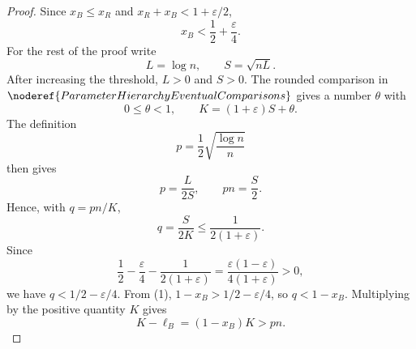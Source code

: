 \begin{proof}
Since \(x_B\le x_R\) and \(x_R+x_B<1+\varepsilon/2\),
\[
x_B<\frac12+\frac{\varepsilon}{4}. \tag{1}
\]
For the rest of the proof write
\[
L=\log n,\qquad S=\sqrt{nL}.
\]
After increasing the threshold, \(L>0\) and \(S>0\).  The rounded comparison in
\(\noderef{ParameterHierarchyEventualComparisons}\) gives a number
\(\theta\) with
\[
0\le\theta<1,\qquad K=(1+\varepsilon)S+\theta. \tag{2}
\]
The definition
\[
p=\frac12\sqrt{\frac{\log n}{n}}
\]
then gives
\[
p=\frac{L}{2S},\qquad pn=\frac S2. \tag{3}
\]
Hence, with \(q=pn/K\),
\[
q=\frac{S}{2K}\le \frac{1}{2(1+\varepsilon)}.
\]
Since
\[
\frac12-\frac{\varepsilon}{4}-\frac{1}{2(1+\varepsilon)}
=\frac{\varepsilon(1-\varepsilon)}{4(1+\varepsilon)}>0,
\]
we have \(q<1/2-\varepsilon/4\).  From (1),
\(1-x_B>1/2-\varepsilon/4\), so \(q<1-x_B\).  Multiplying by the positive
quantity \(K\) gives
\[
K-\ell_B=(1-x_B)K>pn.
\]


\end{proof}
